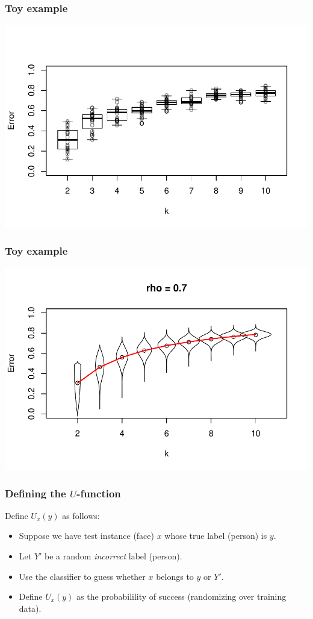 \documentclass{beamer}
\begin{document}
\begin{frame}
\frametitle{Toy example}
\begin{center}
\includegraphics[scale = 0.5]{../extrapolation/autoplots/all_box.pdf}
\end{center}
\end{frame}

\begin{frame}
\frametitle{Toy example}
\begin{center}
\includegraphics[scale = 0.5]{../extrapolation/illus_err_0_7.pdf}
\end{center}
\end{frame}

\begin{frame}
\frametitle{Defining the $U$-function}
Define $U_x(y)$ as follows:
\begin{itemize}
\item Suppose we have test instance (face) $x$ whose true label (person) is $y$.
\item Let $Y'$ be a random \emph{incorrect} label (person).
\item Use the classifier to guess whether $x$ belongs to $y$ or $Y'$.
\item Define $U_x(y)$ as the probabilility of success (randomizing over training data).
\end{itemize}
\end{frame}
\end{document}
